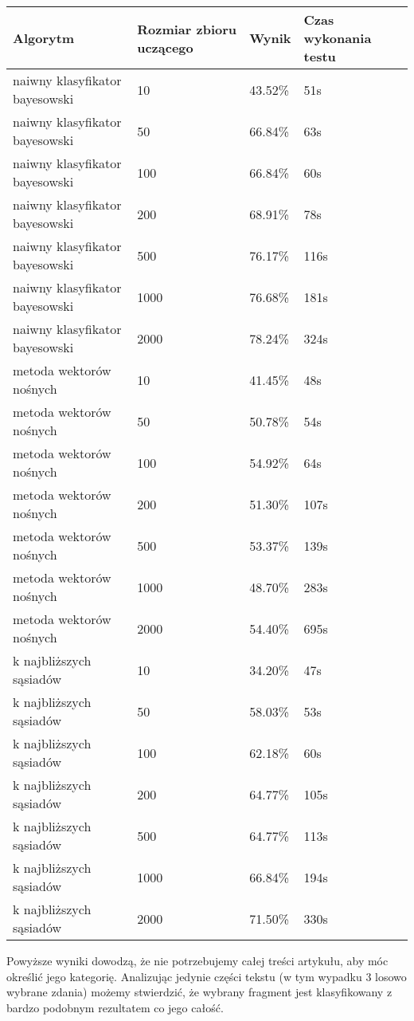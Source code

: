 \begin{center}
\begin{longtable}{ |l|l|l|l| } 
 \hline
 Algorytm & Rozmiar zbioru uczącego & Wynik & Czas wykonania testu \\ 
 \hline
 naiwny klasyfikator bayesowski & 10    & 43.52\% & 51s\\
 naiwny klasyfikator bayesowski & 50    & 66.84\% & 63s\\
 naiwny klasyfikator bayesowski & 100   & 66.84\% & 60s\\
 naiwny klasyfikator bayesowski & 200   & 68.91\% & 78s\\
 naiwny klasyfikator bayesowski & 500   & 76.17\% & 116s\\
 naiwny klasyfikator bayesowski & 1000  & 76.68\% & 181s\\
 naiwny klasyfikator bayesowski & 2000  & 78.24\% & 324s\\
\hline
 metoda wektorów nośnych & 10   & 41.45\% & 48s\\
 metoda wektorów nośnych & 50   & 50.78\% & 54s\\
 metoda wektorów nośnych & 100  & 54.92\% & 64s\\
 metoda wektorów nośnych & 200  & 51.30\% & 107s\\
 metoda wektorów nośnych & 500  & 53.37\% & 139s\\
 metoda wektorów nośnych & 1000 & 48.70\% & 283s\\
 metoda wektorów nośnych & 2000 & 54.40\% & 695s\\
\hline
 k najbliższych sąsiadów & 10   & 34.20\% & 47s\\
 k najbliższych sąsiadów & 50   & 58.03\% & 53s\\
 k najbliższych sąsiadów & 100  & 62.18\% & 60s\\
 k najbliższych sąsiadów & 200  & 64.77\% & 105s\\
 k najbliższych sąsiadów & 500  & 64.77\% & 113s\\
 k najbliższych sąsiadów & 1000 & 66.84\% & 194s\\
 k najbliższych sąsiadów & 2000 & 71.50\% & 330s\\
 \hline
\end{longtable}
\end{center}

Powyższe wyniki dowodzą, że nie potrzebujemy całej treści artykułu, aby móc określić jego kategorię. Analizując jedynie części tekstu (w tym wypadku 3 losowo wybrane zdania) możemy stwierdzić, że wybrany fragment jest klasyfikowany z bardzo podobnym rezultatem co jego całość.
